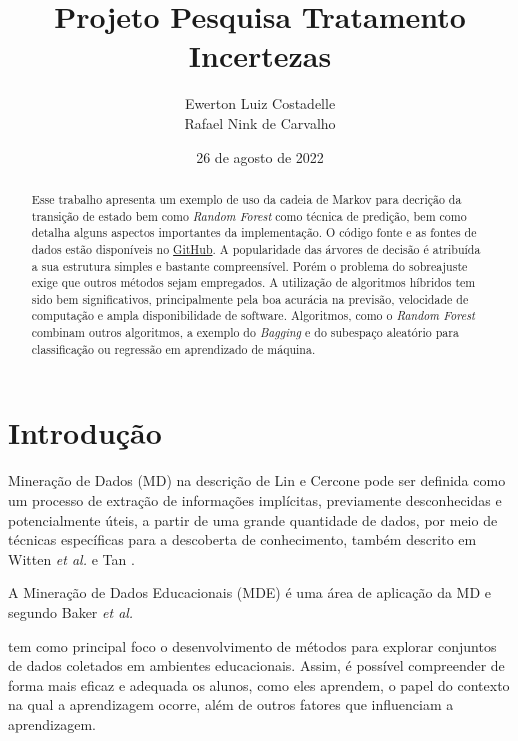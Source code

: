 \documentclass{article}
\title{Projeto Pesquisa Tratamento Incertezas}
\author{Ewerton Luiz Costadelle \\ Rafael Nink de Carvalho}
\date{26 de agosto de 2022}
\begin{document}
\maketitle

\begin{abstract} 
	Esse trabalho apresenta um exemplo de uso da cadeia de Markov para decrição da transição de estado bem como \textit{Random Forest} como técnica de predição, bem como detalha alguns aspectos importantes da implementação. O código fonte e as fontes de dados estão disponíveis no \href{https://github.com/ecostadelle/ProjetoPesquisaTratamentoIncertezas}{GitHub}. A popularidade das árvores de decisão é atribuída a sua estrutura simples e bastante compreensível. Porém o problema do sobreajuste exige que outros métodos sejam empregados. A utilização de algoritmos híbridos tem sido bem significativos, principalmente pela boa acurácia na previsão, velocidade de computação e ampla disponibilidade de software. Algoritmos, como o \emph{Random Forest} combinam outros algoritmos, a exemplo do \emph{Bagging} e do subespaço aleatório para classificação ou regressão em aprendizado de máquina. 
\end{abstract}


\section{Introdução}

Mineração de Dados (MD) na descrição de Lin e Cercone \cite{Lin2012} pode ser definida como um processo de extração de informações implícitas, previamente desconhecidas e potencialmente úteis, a partir de uma grande quantidade de dados, por meio de técnicas específicas para a descoberta de conhecimento, também descrito em Witten \textit{et al.} \cite{Witten2016} e Tan \cite{Tan2019}.

A Mineração de Dados Educacionais (MDE) é uma área de aplicação da MD e segundo Baker \textit{et al.} \cite{Baker2011} 


\begin{quoting}[rightmargin=0cm,leftmargin=2.5cm]
		{\footnotesize 
			\noindent tem como principal foco o desenvolvimento de métodos para explorar conjuntos de dados coletados em ambientes educacionais. Assim, é possível compreender de forma mais eficaz e adequada os alunos, como eles aprendem, o papel do contexto na qual a aprendizagem ocorre, além de outros fatores que influenciam a aprendizagem.
		}
\end{quoting}
\end{document}
